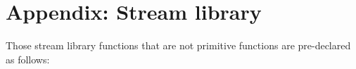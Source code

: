 \section*{Appendix: Stream library}

Those stream library functions that are not primitive functions are pre-declared as follows:


